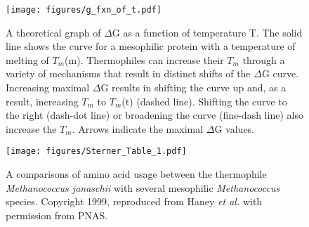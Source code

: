 \begin{figure}[p] \texttt{[image: figures/g\_fxn\_of\_t.pdf]}

\caption[A theoretical graph of $\Delta$G as a function of temperature T]{A
theoretical graph of $\Delta$G as a function of temperature T.  The solid line
shows the curve for a mesophilic protein with a temperature of melting of
${T}_{m}$(m).  Thermophiles can increase their ${T}_{m}$ through a variety of
mechanisms that result in distinct shifts of the $\Delta$G curve.  Increasing
maximal $\Delta$G results in shifting the curve up and, as a result, increasing
${T}_{m}$ to ${T}_{m}$(t) (dashed line).  Shifting the curve to the right
(dash-dot line) or broadening the curve (fine-dash line) also increase the
${T}_{m}$.  Arrows indicate the maximal $\Delta$G values.
}

\label{Sterner_Fig_1} 

\end{figure}

\begin{figure}[p] \texttt{[image: figures/Sterner\_Table\_1.pdf]}

\caption[Comparisons of amino acid usage between the thermophile
\emph{Methanococcus janaschii} with several mesophilic \emph{Methanococcus}
species]{A comparisons of amino acid usage between the thermophile
\emph{Methanococcus janaschii} with several mesophilic \emph{Methanococcus}
species. Copyright 1999, reproduced from Haney \emph{et al.}
\cite{PMID_10097079} with permission from PNAS.}

\label{Sterner_Table_1} 

\end{figure}

% 
% 

